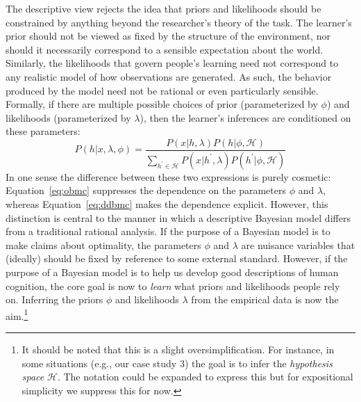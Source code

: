 \documentclass[doc,floatsintext]{apa6}
\newcommand{\be}{\begin{equation}}
\newcommand{\ee}{\end{equation}}
\begin{document}
The descriptive view rejects the idea that priors and likelihoods should be constrained by anything beyond the researcher's theory of the task. The learner's prior should not be viewed as fixed by the structure of the environment, nor should it necessarily correspond to a sensible expectation about the world. Similarly, the likelihoods that govern people's learning need not correspond to any realistic model of how observations are generated. As such, the behavior produced by the model need not be rational or even particularly sensible. Formally, if there are multiple possible choices of prior (parameterized by $\phi$) and likelihoods (parameterized by $\lambda$), then the learner's inferences are conditioned on these parameters:
\be
P(h|x,\lambda,\phi) = \frac{ P(x|h,\lambda) P(h | \phi, \mathcal{H}) }{\sum_{h^\prime \in \mathcal{H}} P(x|h^\prime, \lambda) P(h^\prime|\phi, \mathcal{H})}
\label{eq:ddbmc}
\ee
In one sense the difference between these two expressions is purely cosmetic: Equation~\ref{eq:obmc} suppresses the dependence on the parameters $\phi$ and $\lambda$, whereas Equation~\ref{eq:ddbmc} makes the dependence explicit. However, this distinction is central to the manner in which a descriptive Bayesian model differs from a traditional rational analysis. If the purpose of a Bayesian model is to make claims about optimality, the parameters $\phi$ and $\lambda$ are nuisance variables that (ideally) should be fixed by reference to some external standard. However, if the purpose of a Bayesian model is to help us develop good descriptions of human cognition, the core goal is now to {\it learn} what priors and likelihoods people rely on. Inferring the priors $\phi$ and likelihoods $\lambda$ from the empirical data is now the aim.\footnote{It should be noted that this is a slight oversimplification. For instance, in some situations (e.g., our case study 3) the goal is to infer the {\it hypothesis space} $\mathcal{H}$. The notation could be expanded to express this but for expositional simplicity we suppress this for now.}
\end{document}
